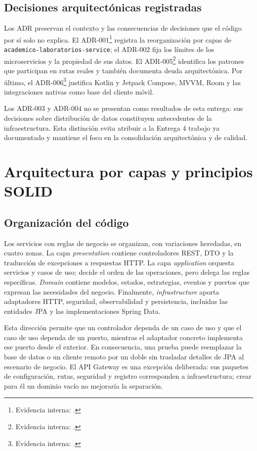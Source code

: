 \subsection{Decisiones arquitectónicas registradas}
\label{subsec:adr-e4}

Los ADR preservan el contexto y las consecuencias de decisiones que el código
por sí solo no explica. El ADR-001\footnote{Evidencia interna:
.} registra la reorganización por capas de
\texttt{academico-laboratorios-service}; el ADR-002 fija los límites de los
microservicios y la propiedad de sus datos. El ADR-005\footnote{Evidencia
interna: .} identifica los patrones que
participan en rutas reales y también documenta deuda arquitectónica. Por último,
el ADR-006\footnote{Evidencia interna:
.} justifica Kotlin y Jetpack Compose,
MVVM, Room y las integraciones nativas como base del cliente móvil.

Los ADR-003 y ADR-004 no se presentan como resultados de esta entrega: sus
decisiones sobre distribución de datos constituyen antecedentes de la
infraestructura. Esta distinción evita atribuir a la Entrega 4 trabajo ya
documentado y mantiene el foco en la consolidación arquitectónica y de calidad.

\section{Arquitectura por capas y principios SOLID}
\label{sec:capas-solid}

\subsection{Organización del código}

Los servicios con reglas de negocio se organizan, con variaciones heredadas, en
cuatro zonas. La capa \emph{presentation} contiene controladores REST, DTO y la
traducción de excepciones a respuestas HTTP. La capa \emph{application}
orquesta servicios y casos de uso; decide el orden de las operaciones, pero
delega las reglas específicas. \emph{Domain} contiene modelos, estados,
estrategias, eventos y puertos que expresan las necesidades del negocio.
Finalmente, \emph{infrastructure} aporta adaptadores HTTP, seguridad,
observabilidad y persistencia, incluidas las entidades JPA y las
implementaciones Spring Data.

Esta dirección permite que un controlador dependa de un caso de uso y que el
caso de uso dependa de un puerto, mientras el adaptador concreto implementa ese
puerto desde el exterior. En consecuencia, una prueba puede reemplazar la base
de datos o un cliente remoto por un doble sin trasladar detalles de JPA al
escenario de negocio. El API Gateway es una excepción deliberada: sus paquetes
de configuración, rutas, seguridad y registro corresponden a infraestructura;
crear para él un dominio vacío no mejoraría la separación.


